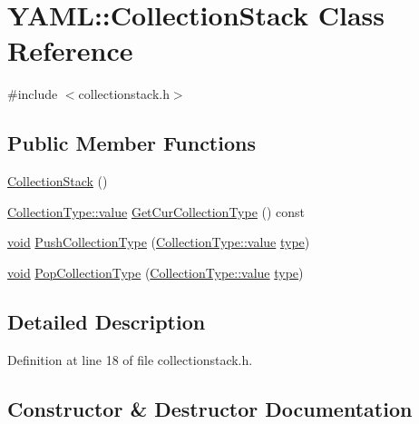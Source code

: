 \hypertarget{class_y_a_m_l_1_1_collection_stack}{}\section{Y\+A\+ML\+::Collection\+Stack Class Reference}
\label{class_y_a_m_l_1_1_collection_stack}


{\ttfamily \#include $<$collectionstack.\+h$>$}

\subsection*{Public Member Functions}
\begin{DoxyCompactItemize}
\item 
\mbox{\hyperlink{class_y_a_m_l_1_1_collection_stack_a3ce645993a85b072513f68f16e26e10f}{Collection\+Stack}} ()
\item 
\mbox{\hyperlink{struct_y_a_m_l_1_1_collection_type_a58f952b2cc7ebfe8423b5f50ed759bad}{Collection\+Type\+::value}} \mbox{\hyperlink{class_y_a_m_l_1_1_collection_stack_af7d0e9804e21e85c8674118ddf636c34}{Get\+Cur\+Collection\+Type}} () const
\item 
\mbox{\hyperlink{glad_8h_a950fc91edb4504f62f1c577bf4727c29}{void}} \mbox{\hyperlink{class_y_a_m_l_1_1_collection_stack_ad8518872b449921cf13d30c66379eaa9}{Push\+Collection\+Type}} (\mbox{\hyperlink{struct_y_a_m_l_1_1_collection_type_a58f952b2cc7ebfe8423b5f50ed759bad}{Collection\+Type\+::value}} \mbox{\hyperlink{glad_8h_a890efa53b3d7deeeced6f3a0d6653ed3}{type}})
\item 
\mbox{\hyperlink{glad_8h_a950fc91edb4504f62f1c577bf4727c29}{void}} \mbox{\hyperlink{class_y_a_m_l_1_1_collection_stack_a6429d74502e07015ec4e9f98a2602e62}{Pop\+Collection\+Type}} (\mbox{\hyperlink{struct_y_a_m_l_1_1_collection_type_a58f952b2cc7ebfe8423b5f50ed759bad}{Collection\+Type\+::value}} \mbox{\hyperlink{glad_8h_a890efa53b3d7deeeced6f3a0d6653ed3}{type}})
\end{DoxyCompactItemize}


\subsection{Detailed Description}


Definition at line 18 of file collectionstack.\+h.



\subsection{Constructor \& Destructor Documentation}
\mbox{\label{class_y_a_m_l_1_1_collection_stack_a3ce645993a85b072513f68f16e26e10f}} 
